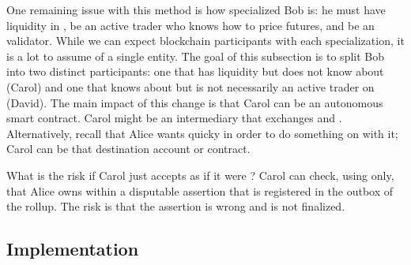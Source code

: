 One remaining issue with this method is how specialized Bob is: he must have liquidity in \ethone, be an active trader who knows how to price futures, and be an \layertwo validator. While we can expect blockchain participants with each specialization, it is a lot to assume of a single entity. The goal of this subsection is to split Bob into two distinct participants: one that has \ethone liquidity but does not know about \layertwo (Carol) and one that knows about \layertwo but is not necessarily an active trader on \layerone (David). The main impact of this change is that Carol can be an autonomous \layerone smart contract. Carol might be an intermediary that exchanges \ethxx and \ethone. Alternatively, recall that Alice wants \ethone quicky in order to do something on \layerone with it; Carol can be that destination account or contract.

What is the risk if Carol just accepts \ethxx as if it were \ethone? Carol can check, using \layerone only, that Alice owns \ethxx within a disputable assertion that is registered in the \layerone outbox of the rollup. The risk is that the assertion is wrong and is not finalized. 


\subsection{Implementation} 

